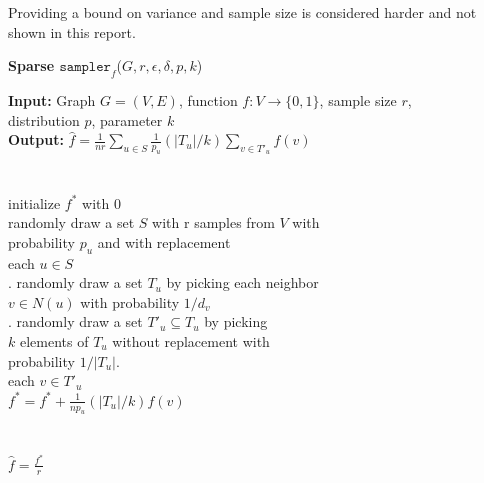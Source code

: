 Providing a bound on variance and sample size is considered harder and not shown in this report.
\begin{algorithm*}[!htb]
\caption{\small {\bf Sparse $\texttt{sampler}_f$}($G, r, \epsilon, \delta, p, k$)}
\begin{code}
{\bf Input:} Graph $G=(V,E)$, function $f : V \rightarrow \{0,1\}$, sample size $r$,\\ distribution $p$, parameter $k$ \\
{\bf Output:} $\hat{f}=\frac{1}{nr}\sum\nolimits_{u\in S}\frac{1}{p_u}(|T_u|/k)\sum\nolimits_{v\in T'_u} f(v)$\\
\\
\uln \>\ubegin\\
\uln \>\>initialize $f^*$ with 0 \\
\uln \>\>randomly draw a set $S$ with r samples from $V$ with\\
\>   \>\>\>probability $p_u$ and with replacement\\
\uln \>\>\ufor each $u \in S$ \udo\\
\uln \>\>. randomly draw a set $T_u$ by picking each neighbor\\
\>   \>\>\>\> $v \in N(u)$ with probability $1/d_v$ \\
\uln \>\>. randomly draw a set $T'_u \subseteq T_u$ by picking\\
\>   \>\>\>\> $k$ elements of $T_u$ without replacement with\\
\>   \>\>\>\> probability $1/|T_u|$.\\
\uln \>\>\>\ufor each $v \in T'_u$ \udo\\
\uln \>\>\>\>$f^* = f^* + \frac{1}{np_u}(|T_u|/k)f(v)$ \\
\uln \>\>\>\uend\\
\uln \>\>\uend\\
\uln \>\ureturn $\hat{f} = \frac{f^*}{r}$ \\
\uln \>\uend\\ 
\end{code}
\label{algsparse}
\end{algorithm*}
